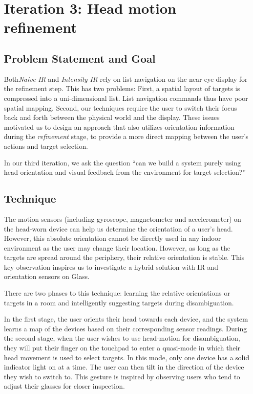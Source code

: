 \section{Iteration 3: Head motion refinement}
\label{sec:iteration-3:-head}
\subsection{Problem Statement and Goal}
Both{\em Naive IR} and {\em Intensity IR} rely on list navigation on the near-eye display for the refinement step. This has two problems: First, a spatial layout of targets is compressed into a uni-dimensional list. List navigation commands thus have poor spatial mapping. Second, our techniques require the user to switch their focus back and forth between the physical world and the display. These issues motivated us to design an approach that also utilizes orientation information during the {\em refinement} stage, to provide a more direct mapping between the user's actions and target selection.

In our third iteration, we ask the question ``can we build a system purely using head orientation and visual feedback from the environment for target selection?''

\subsection{Technique}
The motion sensors (including gyroscope, magnetometer and accelerometer) on the head-worn device can help us determine the orientation of a user's head. However, this absolute orientation cannot be directly used in any indoor environment as the user may change their location. However, as long as the targets are spread around the periphery, their relative orientation is stable. This key observation inspires us to investigate a hybrid solution with IR and orientation sensors on Glass.

There are two phases to this technique: learning the relative orientations or targets in a room and intelligently suggesting targets during disambiguation.

In the first stage, the user orients their head towards each device, and the system learns a map of the devices based on their corresponding sensor readings. During the second stage, when the user wishes to use head-motion for disambiguation, they will put their finger on the touchpad to enter a quasi-mode in which their head movement is used to select targets. In this mode, only one device has a solid indicator light on at a time.   The user can then tilt in the direction of the device they wish to switch to. This gesture is inspired by observing users who tend to adjust their glasses for closer inspection.


